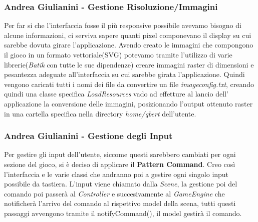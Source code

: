 \documentclass[a4paper,12pt, hidelinks]{report}
\begin{document}
\begin{flushright}
\item\subsubsection{Andrea Giulianini - Gestione Risoluzione/Immagini}
\end{flushright}

Per far si che l'interfaccia fosse il più responsive possibile avevamo bisogno di alcune informazioni, ci serviva sapere quanti pixel componevano il display su cui sarebbe dovuta girare l'applicazione.
Avendo creato le immagini che compongono il gioco in un formato vettoriale(SVG) potevamo tramite l'utilizzo di varie librerie(\emph{Batik} con tutte le sue dipendenze) creare immagini raster di dimensioni e pesantezza adeguate all'interfaccia su cui sarebbe girata l'applicazione. Quindi vengono caricati tutti i nomi dei file da convertire un file \emph{imageconfig.txt}, creando quindi una classe specifica \emph{LoadResources} vado ad effetture al lancio dell' applicazione la conversione delle immagini, posizionando l'output ottenuto raster in una cartella specifica nella directory \emph{home/qbert} dell'utente.

\begin{flushright}
\item\subsubsection{Andrea Giulianini - Gestione degli Input}
\end{flushright}

Per gestire gli input dell'utente, siccome questi sarebbero cambiati per ogni sezione del gioco, si è deciso di applicare il \textbf{Pattern Command}. Creo così l'interfaccia e le varie classi che andranno poi a gestire ogni singolo input possibile da tastiera. L'input viene chiamato dalla \emph{Scene}, la gestione poi del comando poi passerà al \emph{Controller} e succesivamente al \emph{GameEngine} che notificherà l'arrivo del comando al rispettivo model della scena, tutti questi passaggi avvengono tramite il notifyCommand(), il model gestirà il comando.
\end{document}
